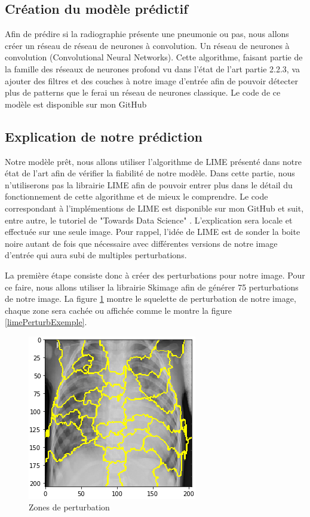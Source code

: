 \subsection{Création du modèle prédictif}
Afin de prédire si la radiographie présente une pneumonie ou pas, nous allons créer un réseau de réseau de neurones à convolution. Un réseau de neurones à convolution (Convolutional Neural Networks). Cette algorithme, faisant partie de la famille des réseaux de neurones profond vu dans l'état de l'art partie 2.2.3, va ajouter des filtres et des couches à notre image d'entrée afin de pouvoir détecter plus de patterns que le ferai un réseau de neurones classique. Le code de ce modèle est disponible sur mon GitHub \cite{pneumoniaDepot}

\subsection{Explication de notre prédiction}
Notre modèle prêt, nous allons utiliser l'algorithme de LIME présenté dans notre état de l'art afin de vérifier la fiabilité de notre modèle. Dans cette partie, nous n'utiliserons pas la librairie LIME afin de pouvoir entrer plus dans le détail du fonctionnement de cette algorithme et de mieux le comprendre. Le code correspondant à l'implémentions de LIME est disponible sur mon GitHub \cite{limeMyDepot} et suit, entre autre, le tutoriel de "Towards Data Science" \cite{limeTuto}. L'explication sera locale et effectuée sur une seule image. Pour rappel,  l’idée de LIME est de sonder la boite noire autant de fois que nécessaire avec différentes versions de notre image d'entrée qui aura subi de multiples perturbations.\par
La première étape consiste donc à créer des perturbations pour notre image. Pour ce faire, nous allons utiliser la librairie Skimage afin de générer 75 perturbations de notre image. La figure \ref{limePerturbSchema} montre le squelette de perturbation de notre image, chaque zone sera cachée ou affichée comme le montre la figure \ref{limePerturbExemple}.\par
\begin{figure}[h]
    \includegraphics[scale=0.6]{src_img/limePerturbSchema.png}
    \caption{Zones de perturbation}
    \label{limePerturbSchema}
\end{figure}

